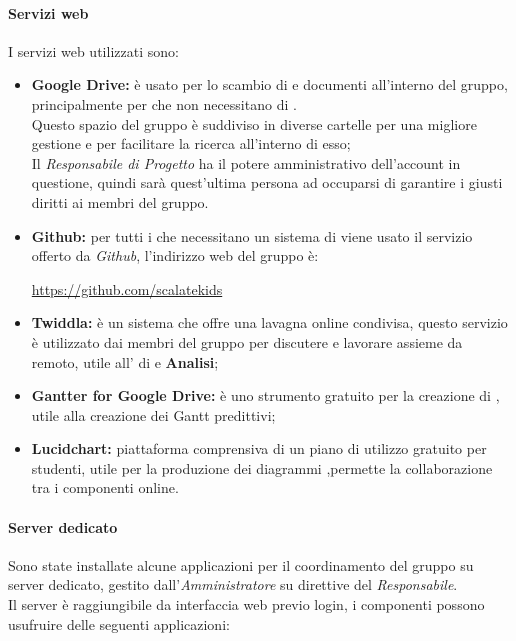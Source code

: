 \documentclass{scalatekids-article}
\begin{document}
\paragraph{Servizi web}
I servizi web utilizzati sono:
\begin{itemize}
\item\textbf{Google Drive:} è usato per lo scambio di  e documenti all'interno del gruppo, principalmente per  che non necessitano di .\\
  Questo spazio del gruppo è suddiviso in diverse cartelle per una migliore gestione e per facilitare la ricerca all'interno di esso;\\
  Il \textit{Responsabile di Progetto} ha il potere amministrativo dell'account in questione, quindi sarà quest'ultima persona ad occuparsi di garantire i giusti diritti ai membri del gruppo.
\item\textbf{Github:} per tutti i  che necessitano un sistema di  viene usato il servizio offerto da \textit{Github}, l'indirizzo web del gruppo è:\\
  \begin{center}
    \url{https://github.com/scalatekids}
  \end{center}
\item\textbf{Twiddla:} è un sistema che offre una lavagna online condivisa, questo servizio è utilizzato dai membri del gruppo per discutere e lavorare assieme da remoto, utile all' di  e \textbf{Analisi};
\item\textbf{Gantter for Google Drive:} è uno strumento gratuito per la creazione di , utile alla creazione dei Gantt predittivi;
\item\textbf{Lucidchart:} piattaforma comprensiva di un piano di utilizzo
  gratuito per studenti, utile per la produzione dei diagrammi
  ,permette la collaborazione tra i componenti online.
\end{itemize}
\paragraph{Server dedicato}
\label{sec:server}
Sono state installate alcune applicazioni per il coordinamento del gruppo su
server dedicato, gestito dall'\textit{Amministratore} su direttive del
\textit{Responsabile}.\\ Il server è raggiungibile da interfaccia web previo
login, i componenti possono usufruire delle seguenti applicazioni:
\end{document}
